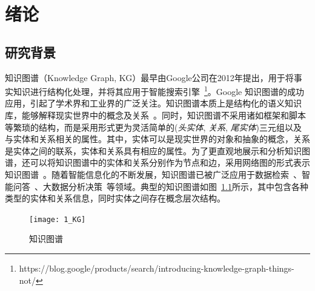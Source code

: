 \documentclass[algorithmlist, AutoFakeBold, AutoFakeSlant, figurelist, tablelist, nomlist, masters]{seuthesix}
\begin{document}
\tableofcontents
\mainmatter  %

\chapter{绪论}
\section{研究背景}
知识图谱（Knowledge Graph, KG）最早由Google公司在2012年提出，用于将事实知识进行结构化处理，并将其应用于智能搜索引擎~\footnote{https://blog.google/products/search/introducing-knowledge-graph-things-not/}。Google 知识图谱的成功应用，引起了学术界和工业界的广泛关注。知识图谱本质上是结构化的语义知识库，能够解释现实世界中的概念及关系~\cite{nickel2015review}。同时，知识图谱不采用诸如框架和脚本等繁琐的结构，而是采用形式更为灵活简单的(\textit{头实体}, \textit{关系}, \textit{尾实体})三元组以及与实体和关系相关的属性。其中，实体可以是现实世界的对象和抽象的概念，关系是实体之间的联系，实体和关系具有相应的属性。为了更直观地展示和分析知识图谱，还可以将知识图谱中的实体和关系分别作为节点和边，采用网络图的形式表示知识图谱~\cite{noy2019industry}。随着智能信息化的不断发展，知识图谱已被广泛应用于数据检索~\cite{rinaldi2021semantic,sarhan2021open,li2021research}、智能问答~\cite{li2021improving,do2021developing}、大数据分析决策~\cite{zhou2021geoscience,abu2021relational}等领域。典型的知识图谱如图~\ref{1_KG}所示，其中包含各种类型的实体和关系信息，同时实体之间存在概念层次结构。
\begin{figure}
  \centering
  \texttt{[image: 1\_KG]}
  \caption{知识图谱}
  \label{1_KG}
\end{figure}
\end{document}
